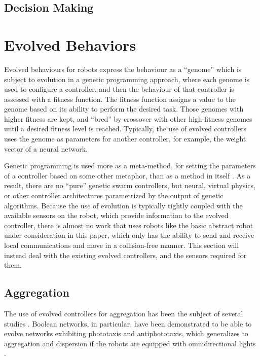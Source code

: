 \documentclass[]{article}
\begin{document}
\subsection{Decision Making}

\section{Evolved Behaviors}

Evolved behaviours for robots express the behaviour as a ``genome'' which is subject to evolution in a genetic programming approach, where each genome is used to configure a controller, and then the behaviour of that controller is assessed with a fitness function. 
The fitness function assigns a value to the genome based on its ability to perform the desired task. 
Those genomes with higher fitness are kept, and ``bred'' by crossover with other high-fitness genomes until a desired fitness level is reached. 
Typically, the use of evolved controllers uses the genome as parameters for another controller, for example, the weight vector of a neural network. 

Genetic programming is used more as a meta-method, for setting the parameters of a controller based on some other metaphor, than as a method in itself \cite{fehervari2013evolution}. 
As a result, there are no ``pure'' genetic swarm controllers, but neural, virtual physics, or other controller architectures parametrized by the output of genetic algorithms. 
Because the use of evolution is typically tightly coupled with the available sensors on the robot, which provide information to the evolved controller, there is almost no work that uses robots like the basic abstract robot under consideration in this paper, which only has the ability to send and receive local communications and move in a collision-free manner. 
This section will instead deal with the existing evolved controllers, and the sensors required for them. 

\subsection{Aggregation}

The use of evolved controllers for aggregation has been the subject of several studies \cite{dorigo2004evolving,bahgecci2005evolving}. 
Boolean networks, in particular, have been demonstrated to be able to evolve networks exhibiting phototaxis and antiphototaxis, which generalizes to aggregation and dispersion if the robots are equipped with omnidirectional lights \cite{roli2011design}.
\end{document}
